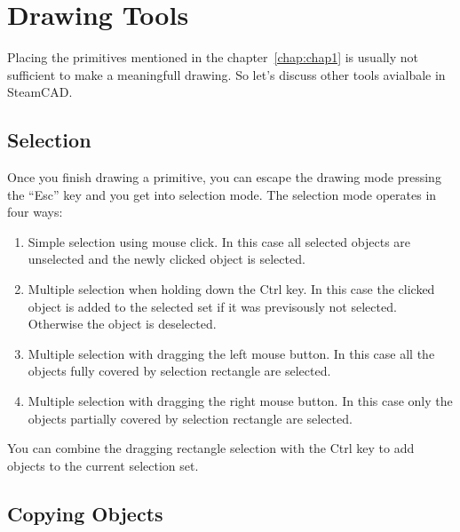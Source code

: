 \chapter{Drawing Tools}\label{chap:chap2}

Placing the primitives mentioned in the chapter~\ref{chap:chap1} is usually not
sufficient to make a meaningfull drawing. So let's discuss other tools avialbale
in SteamCAD.

\section{Selection}

Once you finish drawing a primitive, you can escape the drawing mode pressing the ``Esc''
key and you get into selection mode. The selection mode operates in four ways:
\begin{enumerate}
\item Simple selection using mouse click. In this case all selected objects are unselected
and the newly clicked object is selected.
\item Multiple selection when holding down the Ctrl key. In this case the clicked
object is added to the selected set if it was previsously not selected. Otherwise
the object is deselected.
\item Multiple selection with dragging the left mouse button. In this case all the
objects fully covered by selection rectangle are selected.
\item Multiple selection with dragging the right mouse button. In this case only the
objects partially covered by selection rectangle are selected.
\end{enumerate}

You can combine the dragging rectangle selection with the Ctrl key to add objects
to the current selection set.

\section{Copying Objects}\label{sec:copyobj}

